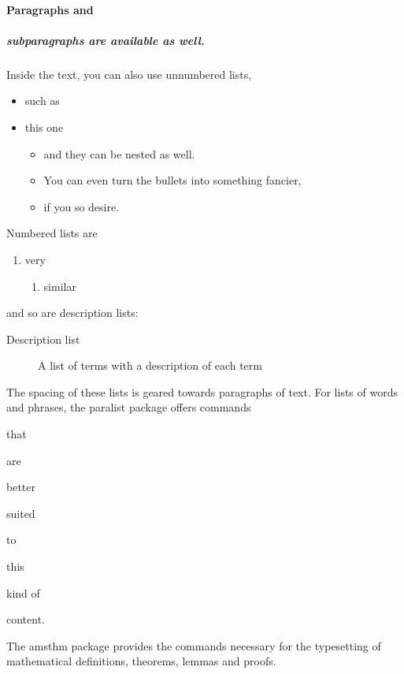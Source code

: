 \documentclass[
  digital,     %
  twoside,     %
  lof,         %
  lot,         %
]{fithesis4}
\begin{document}
\paragraph{Paragraphs and}
\subparagraph{subparagraphs are available as well.}
Inside the text, you can also use unnumbered lists,
\begin{itemize}
  \item such as
  \item this one
  \begin{itemize}
    \item     and they can be nested as well.
    \item[>>] You can even turn the bullets into something fancier,
    \item[\S] if you so desire.
  \end{itemize}
\end{itemize}
Numbered lists are
\begin{enumerate}
  \item very
  \begin{enumerate}
    \item similar
  \end{enumerate}
\end{enumerate}
and so are description lists:
\begin{description}
  \item[Description list]
    A list of terms with a description of each term
\end{description}
The spacing of these lists is geared towards paragraphs of text.
For lists of words and phrases, the \textsf{paralist} package
offers commands
\begin{compactitem}
  \item that
  \begin{compactitem}
    \item are
    \begin{compactitem}
      \item better
      \begin{compactitem}
        \item suited
      \end{compactitem}
    \end{compactitem}
  \end{compactitem}
\end{compactitem}
\begin{compactenum}
  \item to
  \begin{compactenum}
    \item this
    \begin{compactenum}
      \item kind of
      \begin{compactenum}
        \item content.
      \end{compactenum}
    \end{compactenum}
  \end{compactenum}
\end{compactenum}
The \textsf{amsthm} package provides the commands necessary for the
typesetting of mathematical definitions, theorems, lemmas and
proofs.
\end{document}
